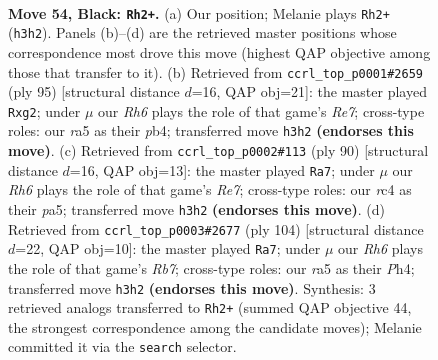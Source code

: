 \documentclass[11pt]{article}
\begin{document}
\clearpage

\begin{figure}[p]\centering
\begin{subfigure}{0.46\textwidth}\centering
\resizebox{\linewidth}{!}{%
\newchessgame
\chessboard[
  setfen={8/5p2/4pk2/R7/P1R1P3/5P1r/4K3/8 b - - 0 54},
  showmover=false,
  pgfstyle=straightmove, color=movearrow, markmove={h3-h2}
]}
\caption{}
\end{subfigure}\hfill
\begin{subfigure}{0.46\textwidth}\centering
\resizebox{\linewidth}{!}{%
\newchessgame
\chessboard[
  setfen={8/1p6/1kp5/8/1PK4R/7P/4r1P1/8 b - - 0 48},
  showmover=false,
  pgfstyle=straightmove, color=movearrow, markmove={e2-g2}
]}
\caption{}
\end{subfigure}
\\[4pt]
\begin{subfigure}{0.46\textwidth}\centering
\resizebox{\linewidth}{!}{%
\newchessgame
\chessboard[
  setfen={8/4Rp2/6k1/p1r4p/5P2/6PK/7P/8 w - - 0 46},
  showmover=false,
  pgfstyle=straightmove, color=movearrow, markmove={e7-a7}
]}
\caption{}
\end{subfigure}\hfill
\begin{subfigure}{0.46\textwidth}\centering
\resizebox{\linewidth}{!}{%
\newchessgame
\chessboard[
  setfen={8/1R4p1/4pk2/4r2p/7P/6K1/5PP1/8 w - - 16 53},
  showmover=false,
  pgfstyle=straightmove, color=movearrow, markmove={b7-a7}
]}
\caption{}
\end{subfigure}
\caption{\textbf{Move 54, Black: \texttt{Rh2+}.} (a) Our position; Melanie plays \texttt{Rh2+} (\texttt{h3h2}). Panels (b)--(d) are the retrieved master positions whose correspondence most drove this move (highest QAP objective among those that transfer to it). (b) Retrieved from \texttt{ccrl\_top\_p0001\#2659} (ply 95) [structural distance $d$=16, QAP obj=21]: the master played \texttt{Rxg2}; under $\mu$ our \emph{Rh6} plays the role of that game's \emph{Re7}; cross-type roles: our \emph{r}a5 as their \emph{p}b4; transferred move \texttt{h3h2} \textbf{(endorses this move)}. (c) Retrieved from \texttt{ccrl\_top\_p0002\#113} (ply 90) [structural distance $d$=16, QAP obj=13]: the master played \texttt{Ra7}; under $\mu$ our \emph{Rh6} plays the role of that game's \emph{Re7}; cross-type roles: our \emph{r}c4 as their \emph{p}a5; transferred move \texttt{h3h2} \textbf{(endorses this move)}. (d) Retrieved from \texttt{ccrl\_top\_p0003\#2677} (ply 104) [structural distance $d$=22, QAP obj=10]: the master played \texttt{Ra7}; under $\mu$ our \emph{Rh6} plays the role of that game's \emph{Rb7}; cross-type roles: our \emph{r}a5 as their \emph{P}h4; transferred move \texttt{h3h2} \textbf{(endorses this move)}. Synthesis: 3 retrieved analogs transferred to \texttt{Rh2+} (summed QAP objective 44, the strongest correspondence among the candidate moves); Melanie committed it via the \texttt{search} selector.}
\label{fig:thought-m107}
\end{figure}
\end{document}
